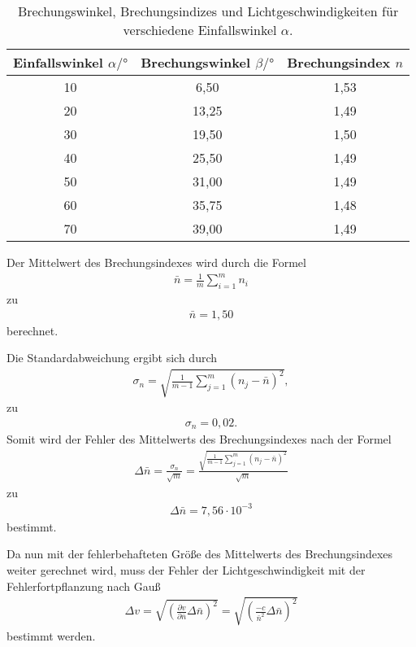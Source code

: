 \begin{table}
  \centering
  \caption{Brechungswinkel, Brechungsindizes und Lichtgeschwindigkeiten für verschiedene Einfallswinkel $\alpha$.}
  \label{tab:Brechung}
  \begin{tabular}{S S S}
  \toprule
  {Einfallswinkel $\alpha / \si{\degree}$} &{Brechungswinkel $\beta / \si{\degree}$} & {Brechungsindex $n$}\\
    & 6,50  & 1,53 \\
  20  & 13,25 & 1,49 \\
  30  & 19,50 & 1,50 \\
  40  & 25,50 & 1,49 \\
  50  & 31,00 & 1,49 \\
  60  & 35,75 & 1,48 \\
  70  & 39,00 & 1,49 \\
  \bottomrule
  \end{tabular}
\end{table}


Der Mittelwert des Brechungsindexes wird durch die Formel
\begin{align*}
    \bar{n}=\frac{1}{m} \sum_{i=1}^m n_i
\end{align*}
zu 
\begin{align*}
  \bar{n}=1,50
\end{align*}
berechnet.

Die Standardabweichung ergibt sich durch
\begin{align*}
    \sigma_n=\sqrt{\frac{1}{m-1}\sum_{j=1}^m (n_j-\bar{n})^2},
\end{align*}
zu
\begin{align*}
  \sigma_n= 0,02.
\end{align*}
Somit wird der Fehler des Mittelwerts des Brechungsindexes nach der Formel
\begin{align*}
    \Delta \bar{n}= \frac{\sigma_n}{\sqrt{m}} = \frac{\sqrt{\frac{1}{m-1}\sum_{j=1}^m (n_j-\bar{n})^2}}{\sqrt{m}}
\end{align*}
zu 
\begin{align*}
  \Delta \bar{n}=7,56 \cdot 10^{-3}
\end{align*}
bestimmt.

Da nun mit der fehlerbehafteten Größe des Mittelwerts des Brechungsindexes weiter gerechnet wird, muss der Fehler der Lichtgeschwindigkeit mit der Fehlerfortpflanzung nach Gauß
\begin{align*}
  \Delta v= \sqrt{\left(\frac{\partial v}{\partial \bar{n}}\Delta \bar{n} \right)^{2}} =  \sqrt{\left(\frac{-c}{\bar{n}^2}\Delta \bar{n} \right)^{2}} \label{eqn:Gauß}
\end{align*}
bestimmt werden.

